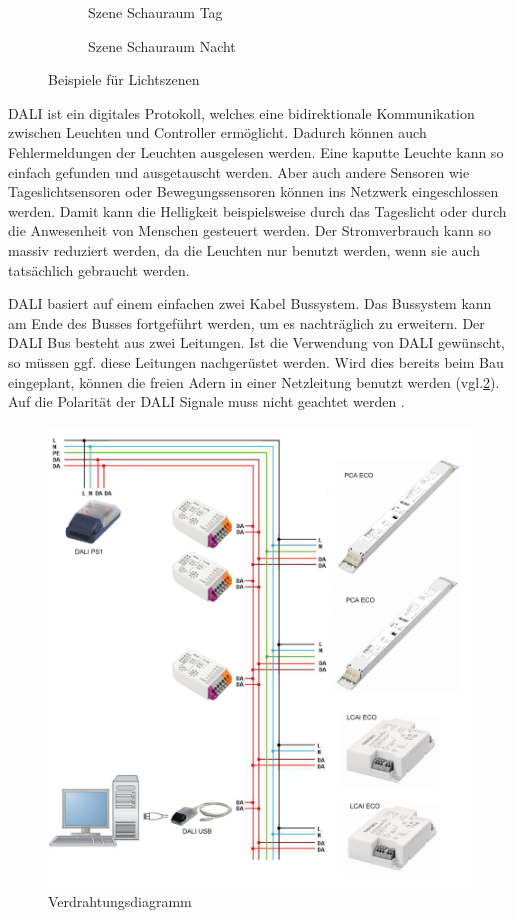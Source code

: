 \begin{figure}[H]
	\centering
	\begin{subfigure}{.5\textwidth}
		\centering
		\caption{Szene Schauraum Tag}
	\end{subfigure}%
	\begin{subfigure}{.5\textwidth}
		\centering
		\caption{Szene Schauraum Nacht}
	\end{subfigure}
	\caption{Beispiele für Lichtszenen \cite[S.6]{DALI_Handbuch}}
	\label{fig:dali_scenes}
\end{figure}

DALI ist ein digitales Protokoll, welches eine bidirektionale Kommunikation zwischen Leuchten und Controller ermöglicht\cite[S.1]{DALI-Lichtmanagement}. Dadurch können auch Fehlermeldungen der Leuchten ausgelesen werden. Eine kaputte Leuchte kann so einfach gefunden und ausgetauscht werden.  Aber auch andere Sensoren wie Tageslichtsensoren oder Bewegungssensoren können ins Netzwerk eingeschlossen werden. Damit kann die Helligkeit beispielsweise durch das Tageslicht oder durch die Anwesenheit von Menschen gesteuert werden. Der Stromverbrauch kann so massiv reduziert werden, da die Leuchten nur benutzt werden, wenn sie auch tatsächlich gebraucht werden.

DALI basiert auf einem einfachen zwei Kabel Bussystem. Das Bussystem kann am Ende des Busses fortgeführt werden, um es nachträglich zu erweitern. Der DALI Bus besteht aus zwei Leitungen. Ist die Verwendung von DALI gewünscht, so müssen ggf. diese Leitungen nachgerüstet werden. Wird dies bereits beim Bau eingeplant, können die freien Adern in einer Netzleitung benutzt werden\cite[S. c.3.2.2]{DALI-Lichtmanagement} (vgl.\ref{fig:wiring diagram}). Auf die Polarität der DALI Signale muss nicht geachtet werden \cite[p.3]{DALI_Handbuch}.

\begin{figure}[H]
	\centering
	\includegraphics[width=.6\linewidth]{Pictures/DaliInstallation}
	\caption{Verdrahtungsdiagramm \cite[S.64]{DALI_Handbuch}}
	\label{fig:wiring diagram}
\end{figure}

